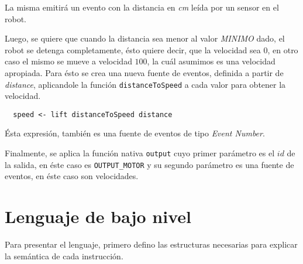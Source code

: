 La misma emitirá un evento con la distancia en \emph{cm} leída
por un sensor en el robot.

  Luego, se quiere que cuando la distancia sea menor al valor
\emph{MINIMO} dado, el robot se detenga completamente, ésto
quiere decir, que la velocidad sea $0$, en otro caso el mismo
se mueve a velocidad $100$, la cuál asumimos es una velocidad
apropiada.
  Para ésto se crea una nueva fuente de eventos, definida a partir
de \emph{distance}, aplicandole la función \texttt{distanceToSpeed} 
a cada valor para obtener la velocidad.

\begin{verbatim}
  speed <- lift distanceToSpeed distance
\end{verbatim}

  Ésta expresión, también es una fuente de eventos
de tipo \emph{Event Number}.

  Finalmente, se aplica la función nativa \texttt{output} cuyo
primer parámetro es el $id$ de la salida, en éste caso es \texttt{OUTPUT\_MOTOR}
y su segundo parámetro es una fuente de eventos,
en éste caso son velocidades.


\section{Lenguaje de bajo nivel}

  Para presentar el lenguaje, primero defino las estructuras
necesarias para explicar la semántica de cada instrucción.

